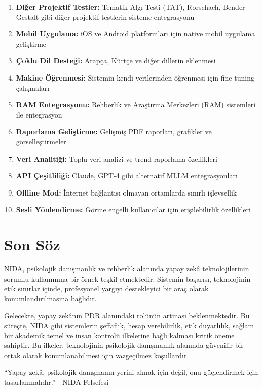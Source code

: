 \begin{enumerate}
  \item \textbf{Diğer Projektif Testler:} Tematik Algı Testi (TAT), Rorschach, Bender-Gestalt gibi diğer projektif testlerin sisteme entegrasyonu

  \item \textbf{Mobil Uygulama:} iOS ve Android platformları için native mobil uygulama geliştirme

  \item \textbf{Çoklu Dil Desteği:} Arapça, Kürtçe ve diğer dillerin eklenmesi

  \item \textbf{Makine Öğrenmesi:} Sistemin kendi verilerinden öğrenmesi için fine-tuning çalışmaları

  \item \textbf{RAM Entegrasyonu:} Rehberlik ve Araştırma Merkezleri (RAM) sistemleri ile entegrasyon

  \item \textbf{Raporlama Geliştirme:} Gelişmiş PDF raporları, grafikler ve görselleştirmeler

  \item \textbf{Veri Analitiği:} Toplu veri analizi ve trend raporlama özellikleri

  \item \textbf{API Çeşitliliği:} Claude, GPT-4 gibi alternatif MLLM entegrasyonları

  \item \textbf{Offline Mod:} İnternet bağlantısı olmayan ortamlarda sınırlı işlevsellik

  \item \textbf{Sesli Yönlendirme:} Görme engelli kullanıcılar için erişilebilirlik özellikleri
\end{enumerate}

\section{Son Söz}

NIDA, psikolojik danışmanlık ve rehberlik alanında yapay zekâ teknolojilerinin sorumlu kullanımına bir örnek teşkil etmektedir. Sistemin başarısı, teknolojinin etik sınırlar içinde, profesyonel yargıyı destekleyici bir araç olarak konumlandırılmasına bağlıdır.

Gelecekte, yapay zekânın PDR alanındaki rolünün artması beklenmektedir. Bu süreçte, NIDA gibi sistemlerin şeffaflık, hesap verebilirlik, etik duyarlılık, sağlam bir akademik temel ve insan kontrolü ilkelerine bağlı kalması kritik öneme sahiptir. Bu ilkeler, teknolojinin psikolojik danışmanlık alanında güvenilir bir ortak olarak konumlanabilmesi için vazgeçilmez koşullardır.

\begin{quotebox}
``Yapay zekâ, psikolojik danışmanın yerini almak için değil, onu güçlendirmek için tasarlanmalıdır.'' - NIDA Felsefesi
\end{quotebox}

\newpage
